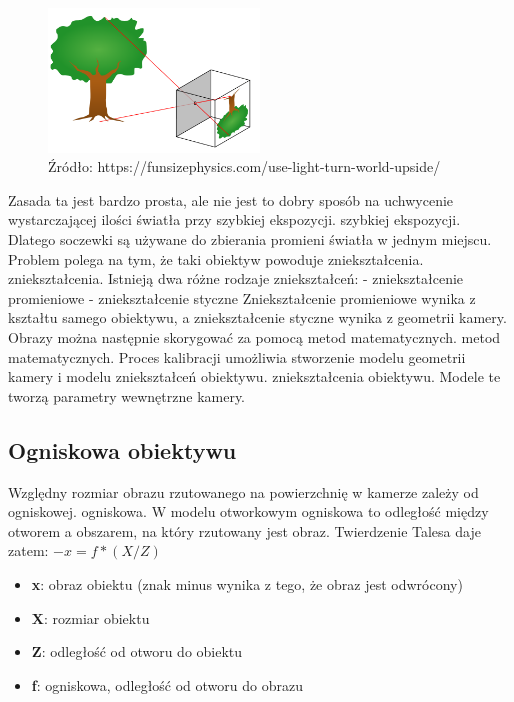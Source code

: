\documentclass[magisterska]{pracadypl}
\begin{document}
\begin{figure}[h]  %
    \centering  %
    \includegraphics[width=0.5\textwidth]{images/light.png}  %
    \captionsetup{labelformat=empty, font=footnotesize}
    \caption{Źródło: https://funsizephysics.com/use-light-turn-world-upside/}
    \label{fig:rpi}  %
\end{figure}

Zasada ta jest bardzo prosta, ale nie jest to dobry sposób na uchwycenie wystarczającej ilości światła przy szybkiej ekspozycji.
szybkiej ekspozycji. Dlatego soczewki są używane do zbierania
promieni światła w jednym miejscu. Problem polega na tym, że taki obiektyw powoduje zniekształcenia.
zniekształcenia.
Istnieją dwa różne rodzaje zniekształceń:
- zniekształcenie promieniowe
- zniekształcenie styczne
Zniekształcenie promieniowe wynika z kształtu samego obiektywu, a zniekształcenie styczne
wynika z geometrii kamery. Obrazy można następnie skorygować za pomocą metod matematycznych.
metod matematycznych.
Proces kalibracji umożliwia stworzenie modelu geometrii kamery i modelu zniekształceń obiektywu.
zniekształcenia obiektywu. Modele te tworzą parametry wewnętrzne kamery.

\subsection{Ogniskowa obiektywu}

Względny rozmiar obrazu rzutowanego na powierzchnię w kamerze zależy od ogniskowej.
ogniskowa. W modelu otworkowym ogniskowa to odległość między otworem
a obszarem, na który rzutowany jest obraz.
Twierdzenie Talesa daje zatem: $-x = f * (X / Z)$

\begin{itemize}
  \item \textbf{x}: obraz obiektu (znak minus wynika z tego, że obraz jest odwrócony)
  \item \textbf{X}: rozmiar obiektu
  \item \textbf{Z}: odległość od otworu do obiektu
  \item \textbf{f}: ogniskowa, odległość od otworu do obrazu
\end{itemize}
\end{document}
